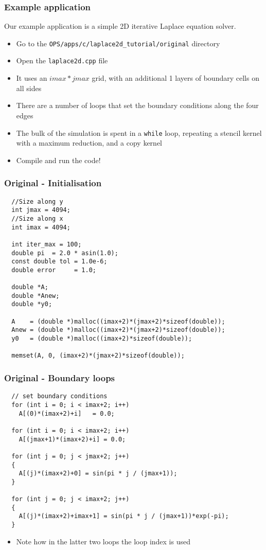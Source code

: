 \documentclass{beamer}
\begin{document}
\begin{frame}
\frametitle{Example application}
Our example application is a simple 2D iterative Laplace equation solver.
\begin{itemize}
\item Go to the \texttt{OPS/apps/c/laplace2d\_tutorial/original} directory
\item Open the \texttt{laplace2d.cpp} file
\item It uses an $imax*jmax$ grid, with an additional 1 layers of boundary cells on all sides
\item There are a number of loops that set the boundary conditions along the four edges
\item The bulk of the simulation is spent in a \texttt{while} loop, repeating a stencil kernel with a maximum reduction, and a copy kernel
\item Compile and run the code!
\end{itemize}
\end{frame}

\begin{frame}[fragile]
\frametitle{Original - Initialisation}

\begin{lstlisting}
  //Size along y
  int jmax = 4094;
  //Size along x
  int imax = 4094;
  
  int iter_max = 100;
  double pi  = 2.0 * asin(1.0);
  const double tol = 1.0e-6;
  double error     = 1.0;

  double *A;
  double *Anew;
  double *y0;

  A    = (double *)malloc((imax+2)*(jmax+2)*sizeof(double));
  Anew = (double *)malloc((imax+2)*(jmax+2)*sizeof(double));
  y0   = (double *)malloc((imax+2)*sizeof(double));

  memset(A, 0, (imax+2)*(jmax+2)*sizeof(double));\end{lstlisting}

\end{frame}

\begin{frame}[fragile]
\frametitle{Original - Boundary loops}

\begin{lstlisting}
  // set boundary conditions
  for (int i = 0; i < imax+2; i++)
    A[(0)*(imax+2)+i]   = 0.0;

  for (int i = 0; i < imax+2; i++)
    A[(jmax+1)*(imax+2)+i] = 0.0;

  for (int j = 0; j < jmax+2; j++)
  {
    A[(j)*(imax+2)+0] = sin(pi * j / (jmax+1));
  }

  for (int j = 0; j < imax+2; j++)
  {
    A[(j)*(imax+2)+imax+1] = sin(pi * j / (jmax+1))*exp(-pi);
  }
  \end{lstlisting}
\begin{itemize}
\item Note how in the latter two loops the loop index is used
\end{itemize}
\end{frame}
\end{document}
